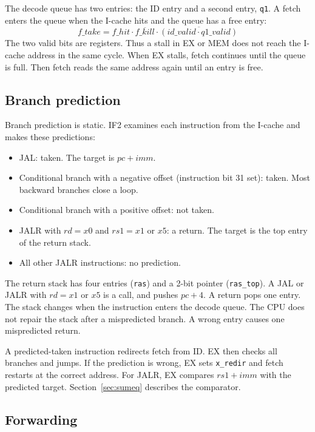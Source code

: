 The decode queue has two entries: the ID entry and a second entry, \texttt{q1}. A fetch enters the queue when the I-cache hits and the queue has a free entry:
\begin{equation*}
  f\_take = f\_hit \cdot \overline{f\_kill} \cdot \overline{(id\_valid \cdot q1\_valid)}
\end{equation*}
The two valid bits are registers. Thus a stall in EX or MEM does not reach the I-cache address in the same cycle. When EX stalls, fetch continues until the queue is full. Then fetch reads the same address again until an entry is free.

\subsection{Branch prediction}

Branch prediction is static. IF2 examines each instruction from the I-cache and makes these predictions:

\begin{itemize}
  \item JAL: taken. The target is $pc + imm$.
  \item Conditional branch with a negative offset (instruction bit 31 set): taken. Most backward branches close a loop.
  \item Conditional branch with a positive offset: not taken.
  \item JALR with $rd = x0$ and $rs1 = x1$ or $x5$: a return. The target is the top entry of the return stack.
  \item All other JALR instructions: no prediction.
\end{itemize}

The return stack has four entries (\texttt{ras}) and a 2-bit pointer (\texttt{ras\_top}). A JAL or JALR with $rd = x1$ or $x5$ is a call, and pushes $pc + 4$. A return pops one entry. The stack changes when the instruction enters the decode queue. The CPU does not repair the stack after a mispredicted branch. A wrong entry causes one mispredicted return.

A predicted-taken instruction redirects fetch from ID. EX then checks all branches and jumps. If the prediction is wrong, EX sets \texttt{x\_redir} and fetch restarts at the correct address. For JALR, EX compares $rs1 + imm$ with the predicted target. Section~\ref{sec:sumeq} describes the comparator.

\subsection{Forwarding}


